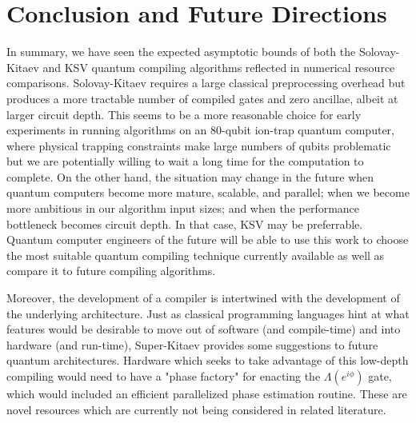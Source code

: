 \section{Conclusion and Future Directions}

In summary, we have seen the expected asymptotic bounds of both the
Solovay-Kitaev and KSV quantum compiling algorithms reflected in
numerical resource comparisons. Solovay-Kitaev requires a large classical
preprocessing overhead but produces a more tractable number of compiled
gates and zero ancillae, albeit at larger circuit depth. This seems to be
a more reasonable choice for early experiments in running algorithms on an
80-qubit ion-trap quantum computer, where physical trapping constraints
make large numbers of qubits problematic but we are potentially willing to
wait a long time for the computation to complete. On the other hand, the
situation may change in the future when
quantum computers become more mature, scalable, and parallel;
when we become more ambitious in our
algorithm input sizes; and when the performance bottleneck becomes circuit depth.
In that case, KSV may be preferrable.
Quantum computer engineers of the future will be able to use this work to
choose the most suitable quantum compiling technique currently available
as well as compare it to future compiling algorithms.

Moreover, the development of a compiler is intertwined with the
development of the underlying architecture. Just as classical programming
languages hint at what features would be desirable to move out of software
(and compile-time)
and into hardware (and run-time), Super-Kitaev provides some suggestions
to future quantum architectures. Hardware which seeks to take advantage of
this low-depth compiling would need to have a
"phase factory" for enacting the $\Lambda(e^{i\phi})$ gate, which would
included an efficient parallelized phase estimation routine. These are
novel resources which are currently not being considered in related literature.
